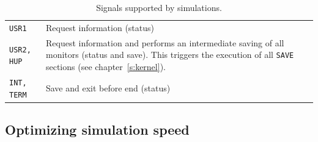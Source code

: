 \begin{table}
  \begin{center}
    {\let\my=\\
    \begin{tabular}{|p{}|p{}|}
      \hline
      \texttt{USR1} & Request information (status)  \\
      \texttt{USR2, HUP} & Request information and performs an intermediate
      saving of all monitors (status and save). This triggers the execution of
      all \texttt{SAVE} sections (see chapter~\ref{s:kernel}).  \\
      \texttt{INT, TERM} & Save and exit before end (status)  \\
      \hline
    \end{tabular}
    \caption{Signals supported by \MCX simulations.}
    \label{t:signals}
    }
  \end{center}
\end{table}

\subsection{Optimizing simulation speed}
\label{s:optim}

